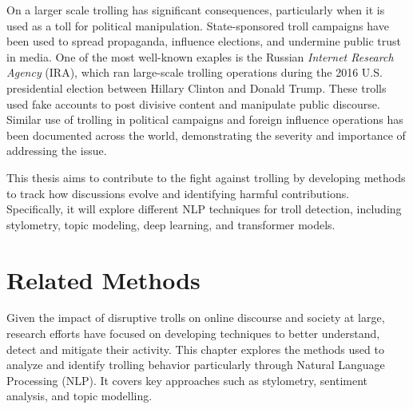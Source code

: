 \documentclass[twoside]{ctuthesis}
\theoremstyle{plain}
\theoremstyle{definition}
\theoremstyle{note}
\begin{document}
On a larger scale trolling has significant consequences, particularly when it is used as a toll for political manipulation. State-sponsored troll campaigns have been used to spread propaganda, influence elections, and undermine public trust in media.\cite{Bradshaw2017TroopsTrolls} One of the most well-known exaples is the Russian \textit{Internet Research Agency} (IRA), which ran large-scale trolling operations during the 2016 U.S. presidential election between Hillary Clinton and Donald Trump. These trolls used fake accounts to post divisive content and manipulate public discourse.\cite{Linvill2020IRATrolls} Similar use of trolling in political campaigns and foreign influence operations has been documented across the world, demonstrating the severity and importance of addressing the issue.\par

This thesis aims to contribute to the fight against trolling by developing methods to track how discussions evolve and identifying harmful contributions. Specifically, it will explore different NLP techniques for troll detection, including stylometry, topic modeling, deep learning, and transformer models.

\chapter{Related Methods}
Given the impact of disruptive trolls on online discourse and society at large, research efforts have focused on developing techniques to better understand, detect and mitigate their activity. This chapter explores the methods used to analyze and identify trolling behavior particularly through Natural Language Processing (NLP). It covers key approaches such as stylometry, sentiment analysis, and topic modelling.
\end{document}
